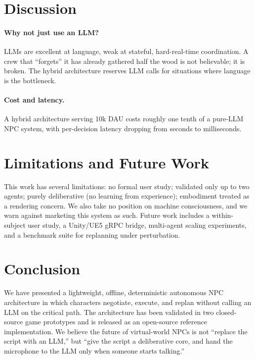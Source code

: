 \documentclass[sigconf, authorversion]{acmart}
\begin{document}
\section{Discussion}
\label{sec:discuss}
\paragraph{Why not just use an LLM?} LLMs are excellent at language, weak
at stateful, hard-real-time coordination. A crew that ``forgets'' it has
already gathered half the wood is not believable; it is broken. The
hybrid architecture reserves LLM calls for situations where language is
the bottleneck.

\paragraph{Cost and latency.} A hybrid architecture serving 10k DAU
costs roughly one tenth of a pure-LLM NPC system, with per-decision
latency dropping from seconds to milliseconds.

\section{Limitations and Future Work}
This work has several limitations: no formal user study; validated only up
to two agents; purely deliberative (no learning from experience);
embodiment treated as a rendering concern. We also take no position on
machine consciousness, and we warn against marketing this system as such.
Future work includes a within-subject user study, a Unity/UE5 gRPC
bridge, multi-agent scaling experiments, and a benchmark suite for
replanning under perturbation.

\section{Conclusion}
We have presented a lightweight, offline, deterministic autonomous NPC
architecture in which characters negotiate, execute, and replan without
calling an LLM on the critical path. The architecture has been validated
in two closed-source game prototypes and is released as an open-source
reference implementation. We believe the future of virtual-world NPCs is
not ``replace the script with an LLM,'' but ``give the script a
deliberative core, and hand the microphone to the LLM only when someone
starts talking.''
\end{document}
